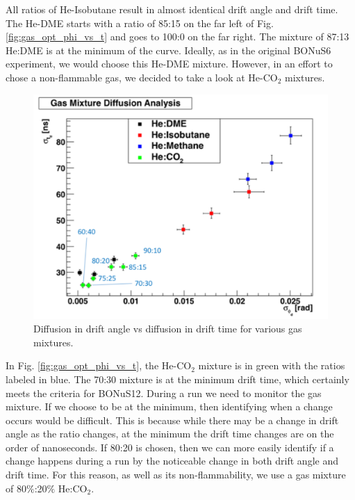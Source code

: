 All ratios of He-Isobutane result in almost identical drift angle and drift time. The He-DME starts with a ratio of 85:15 on the far left of Fig. \ref{fig:gas_opt_phi_vs_t} and goes to 100:0 on the far right. The mixture of 87:13 He:DME is at the minimum of the curve. Ideally, as in the original BONuS6 experiment, we would choose this He-DME mixture. However, in an effort to chose a non-flammable gas, we decided to take a look at He-CO$_2$ mixtures.

\begin{figure}[h!]
	\centering
	\includegraphics[width=0.8\linewidth]{figures/gas_opt_sigphi_vs_sigt.png}
	\caption{Diffusion in drift angle vs diffusion in drift time for various gas mixtures.}
	\label{fig:gas_opt_sigphi_vs_sigt}
\end{figure}

In Fig. \ref{fig:gas_opt_phi_vs_t}, the He-CO$_2$ mixture is in green with the ratios labeled in blue. The 70:30 mixture is at the minimum drift time, which certainly meets the criteria for BONuS12. During a run we need to monitor the gas mixture. If we choose to be at the minimum, then identifying when a change occurs would be difficult. This is because while there may be a change in drift angle as the ratio changes, at the minimum the drift time changes are on the order of nanoseconds. If 80:20 is chosen, then we can more easily identify if a change happens during a run by the noticeable change in both drift angle and drift time. For this reason, as well as its non-flammability, we use a gas mixture of 80$\%$:20$\%$ He:CO$_2$.

